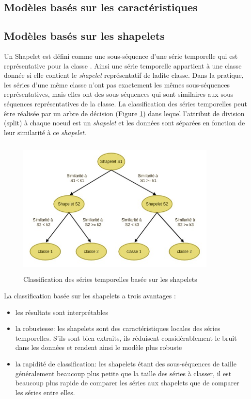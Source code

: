\subsection{Modèles basés sur les caractéristiques}\label{sec:feature_based_model}

\subsection{Modèles basés sur les shapelets}\label{sec:shapelet_based_model}
Un Shapelet est défini comme une sous-séquence d'une série temporelle qui est représentative pour la classe \citep{ye2009time}. Ainsi une série temporelle appartient à une classe donnée si elle contient le \textit{shapelet} représentatif de ladite classe. Dans la pratique, les séries d'une même classe n'ont pas exactement les mêmes sous-séquences représentatives, mais elles ont des sous-séquences qui sont similaires aux sous-séquences représentatives de la classe. 
La classification des séries temporelles peut être réalisée par un arbre de décision (Figure \ref{fig:shapelet_based_dt}) dans lequel l'attribut de division (split) à chaque noeud est un \textit{shapelet} et les données sont séparées en fonction de leur similarité à ce \textit{shapelet}.

\begin{figure}[!h]
    \centering
    \includegraphics[width=10cm,height=7cm]{report/figures/shapelet-based-tree.jpg}
    \caption{Classification des séries temporelles basée sur les shapelets}
    \label{fig:shapelet_based_dt}
\end{figure}

La classification basée sur les shapelets a trois avantages \citep{ye2009time}:
\begin{itemize}
    \item les résultats sont interprétables 
    \item la robustesse: les shapelets sont des caractéristiques locales des séries temporelles. S'ils sont bien extraits, ils réduisent considérablement le bruit dans les données et rendent ainsi le modèle plus robuste
    \item la rapidité de classification: les shapelets étant des sous-séquences de taille généralement beaucoup plus petite que la taille des séries à classer, il est beaucoup plus rapide de comparer les séries aux shapelets que de comparer les séries entre elles.
\end{itemize}

